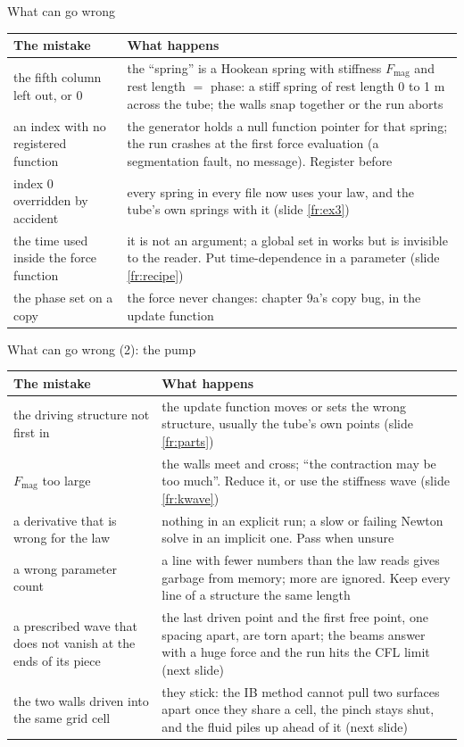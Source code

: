 \documentclass[aspectratio=169,11pt]{beamer}
\begin{document}
\begin{frame}{What can go wrong}
\label{fr:wrong}
\scriptsize
\begin{tabular}{@{}L{0.32\textwidth}L{0.6\textwidth}@{}}
\toprule
The mistake & What happens\\
\midrule
the fifth column left out, or 0 & the ``spring'' is a Hookean spring with stiffness $F_{\mathrm{mag}}$ and rest length $=$ phase: a stiff spring of rest length 0 to 1 m across the tube; the walls snap together or the run aborts\\
an index with no registered function & the generator holds a null function pointer for that spring; the run crashes at the first force evaluation (a segmentation fault, no message). Register before \\
index 0 overridden by accident & every spring in every file now uses your law, and the tube's own springs with it (slide \ref{fr:ex3})\\
the time used inside the force function & it is not an argument; a global set in  works but is invisible to the reader. Put time-dependence in a parameter (slide \ref{fr:recipe})\\
the phase set on a copy & the force never changes: chapter 9a's copy bug, in the update function\\
\bottomrule
\end{tabular}
\end{frame}

\begin{frame}{What can go wrong (2): the pump}
\label{fr:wrong1b}
\scriptsize
\begin{tabular}{@{}L{0.32\textwidth}L{0.6\textwidth}@{}}
\toprule
The mistake & What happens\\
\midrule
the driving structure not first in  & the update function moves or sets the wrong structure, usually the tube's own points (slide \ref{fr:parts})\\
$F_{\mathrm{mag}}$ too large & the walls meet and cross; ``the contraction may be too much''. Reduce it, or use the stiffness wave (slide \ref{fr:kwave})\\
a derivative that is wrong for the law & nothing in an explicit run; a slow or failing Newton solve in an implicit one. Pass  when unsure\\
a wrong parameter count & a line with fewer numbers than the law reads gives garbage from memory; more are ignored. Keep every line of a structure the same length\\
a prescribed wave that does not vanish at the ends of its piece & the last driven point and the first free point, one spacing apart, are torn apart; the beams answer with a huge force and the run hits the CFL limit (next slide)\\
the two walls driven into the same grid cell & they stick: the IB method cannot pull two surfaces apart once they share a cell, the pinch stays shut, and the fluid piles up ahead of it (next slide)\\
\bottomrule
\end{tabular}
\end{frame}
\end{document}
